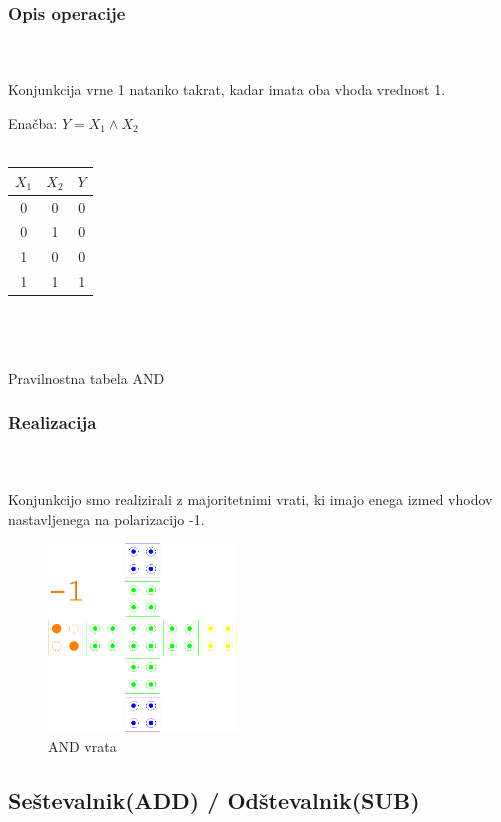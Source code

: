 \documentclass[seminar, slovene]{FRIreport}
\begin{document}
\subsubsection{Opis operacije}\ \\ \ \\
Konjunkcija vrne 1 natanko takrat, kadar imata oba vhoda vrednost 1.
\ \\
\begin{table}[H]
\begin{center}
Enačba: $ Y = X_1 \wedge X_2 $\\ \ \\
\begin{tabular}{ | c | c || c | }\hline
$X_1$ & $X_2$ & $Y$ \\ \hline
0 & 0 & 0\\
0 & 1 & 0\\
1 & 0 & 0\\
1 & 1 & 1\\ \hline
\end{tabular}\\ \ \\ \ \\
Pravilnostna tabela AND
\end{center}
\end{table}

\subsubsection{Realizacija}\ \\ \ \\
Konjunkcijo smo realizirali z majoritetnimi vrati, ki imajo enega izmed vhodov nastavljenega na polarizacijo -1.
\begin{figure}[H]
\begin{center}
\includegraphics[width=5cm]{qca/img/AND}
\caption{AND vrata}
\label{AND}
\end{center}
\end{figure}

\subsection{Seštevalnik(ADD) / Odštevalnik(SUB)}
\end{document}
